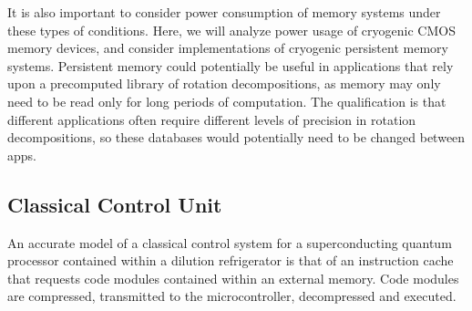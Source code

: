 It is also important to consider power consumption of memory systems under these types of conditions. Here, we will analyze power usage of cryogenic CMOS memory devices, and consider implementations of cryogenic persistent memory systems. Persistent memory could potentially be useful in applications that rely upon a precomputed library of rotation decompositions, as memory may only need to be read only for long periods of computation. The qualification is that different applications often require different levels of precision in rotation decompositions, so these databases would potentially need to be changed between apps.

\subsection{Classical Control Unit}

An accurate model of a classical control system for a superconducting quantum processor contained within a dilution refrigerator is that of an instruction cache that requests code modules contained within an external memory. Code modules are compressed, transmitted to the microcontroller, decompressed and executed.  
